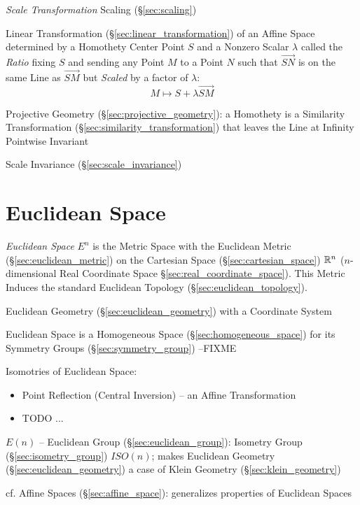 \emph{Scale Transformation} \fist Scaling (\S\ref{sec:scaling})

Linear Transformation (\S\ref{sec:linear_transformation}) of an Affine Space
determined by a Homothety Center Point $S$ and a Nonzero Scalar $\lambda$
called the \emph{Ratio} fixing $S$ and sending any Point $M$ to a Point $N$
such that $\vec{SN}$ is on the same Line as $\vec{SM}$ but \emph{Scaled} by a
factor of $\lambda$:
\[
  M \mapsto S + \lambda\vec{SM}
\]

\fist Projective Geometry (\S\ref{sec:projective_geometry}): a Homothety is a
Similarity Transformation (\S\ref{sec:similarity_transformation}) that leaves
the Line at Infinity Pointwise Invariant

\fist Scale Invariance (\S\ref{sec:scale_invariance})



\section{Euclidean Space}\label{sec:euclidean_space}

\emph{Euclidean Space} $\xspace{E}^n$ is the Metric Space with the Euclidean
Metric (\S\ref{sec:euclidean_metric}) on the Cartesian Space
(\S\ref{sec:cartesian_space}) $\mathbb{R}^n$ ($n$-dimensional Real Coordinate Space
\S\ref{sec:real_coordinate_space}). This Metric Induces the standard Euclidean
Topology (\S\ref{sec:euclidean_topology}).

Euclidean Geometry (\S\ref{sec:euclidean_geometry}) with a Coordinate System

Euclidean Space is a Homogeneous Space (\S\ref{sec:homogeneous_space}) for its
Symmetry Groups (\S\ref{sec:symmetry_group}) --FIXME

Isomotries of Euclidean Space:
\begin{itemize}
  \item Point Reflection (Central Inversion) -- an Affine Transformation
  \item TODO
  ...
\end{itemize}

$E(n)$ -- Euclidean Group (\S\ref{sec:euclidean_group}): Isometry Group
(\S\ref{sec:isometry_group}) $ISO(n)$; makes Euclidean Geometry
(\S\ref{sec:euclidean_geometry}) a case of Klein Geometry
(\S\ref{sec:klein_geometry})

cf. Affine Spaces (\S\ref{sec:affine_space}): generalizes properties
of Euclidean Spaces


